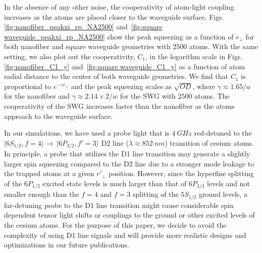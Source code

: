 \documentclass[preprint,aps,pra,onecolumn,superscriptaddress]{revtex4-1} %
\def\ket#1{\lvert{#1}\rangle}%
\begin{document}
{\color{red} In the absence of any other noise, the cooperativity of atom-light coupling increases as the atoms are placed closer to the waveguide surface. Figs.\ref{fig:nanofiber_peakxi_rp_NA2500} and~\ref{fig:square waveguide_peakxi_rp_NA2500} show the peak squeezing  as a function of $ r\!_\perp $ for both nanofiber and square waveguide geometries with $2500$ atoms. With the same setting, we also plot out the cooperativity, $ C_1 $, in the logarithm scale in Figs.\ref{fig:nanofiber_C1_y} and~\ref{fig:square waveguide_C1_y} as a function of atom radial distance to the center of both waveguide geometries. We find that $C_1$ is proportional to $ e^{-\gamma r\!_\perp} $ and the peak squeezing scales as $ \sqrt{OD} $, where $ \gamma\approx 1.65/a $ for the nanofiber and $ \gamma\approx 2.14\times 2/w $ for the SWG with $2500$ atoms. The cooperativity of the SWG increases faster than the nanofiber as the atoms approach to the waveguide surface. 

In our simulations, we have used a probe light that is $\SI{4}{GHz}$ red-detuned to the $\ket{6S_{1/2}, f=4}\rightarrow \ \ket{6P_{3/2},f'=3}$ D2 line ($ \lambda\approx \SI{852}{nm} $) transition of cesium atoms. In principle, a probe that utilizes the D1 line transition may generate a slightly larger spin squeezing compared to the D2 line due to a stronger mode leakage to the trapped atoms at a given $ r'_\perp $ position. However, since the hyperfine splitting of the $ 6P_{1/2} $ excited state levels is much larger than that of $ 6P_{3/2} $ levels and not smaller enough than the $ f=4 $ and $ f=3 $ splitting of the $ 5S_{1/2} $ ground levels, a far-detuning probe to the D1 line transition might cause considerable spin dependent tensor light shifts or couplings to the ground or other excited levels of the cesium atoms. For the purpose of this paper, we decide to avoid the complexity of using D1 line signals and will provide more realistic designs and optimizations in our future publications. }
\end{document}
